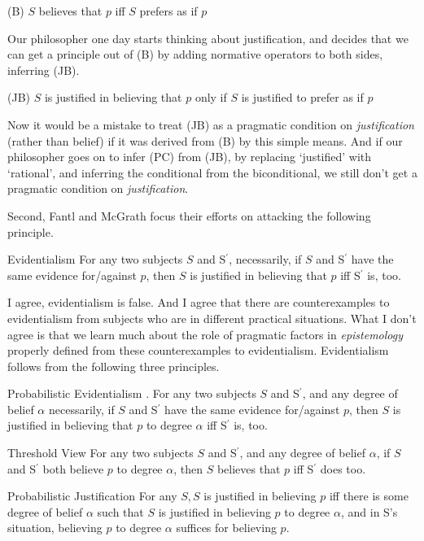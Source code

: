 \begin{description*}
\item[(B)] \(S\) believes that \(p\) iff \(S\) prefers as if \(p\)
\end{description*}

\noindent Our philosopher one day starts thinking about justification, and decides that we can get a principle out of (B) by adding normative operators to both sides, inferring (JB).

\begin{description*}
\item[(JB)] \(S\) is justified in believing that \(p\) only if \(S\) is justified to prefer as if \(p\)
\end{description*}

\noindent Now it would be a mistake to treat (JB) as a pragmatic condition on \textit{justification} (rather than belief) if it was derived from (B) by this simple means. And if our philosopher goes on to infer (PC) from (JB), by replacing `justified' with `rational', and inferring the conditional from the biconditional, we still don't get a pragmatic condition on \textit{justification}.

Second, Fantl and McGrath focus their efforts on attacking the following principle.

\begin{description*}
\item[Evidentialism] For any two subjects \(S\) and S\(^\prime\), necessarily, if \(S\) and S\(^\prime\) have the same evidence for/against \(p\), then \(S\) is justified in believing that \(p\) iff S\(^\prime\) is, too.
\end{description*}

\noindent I agree, evidentialism is false. And I agree that there are counterexamples to evidentialism from subjects who are in different practical situations. What I don't agree is that we learn much about the role of pragmatic factors in \textit{epistemology} properly defined from these counterexamples to evidentialism. Evidentialism follows from the following three principles.

\begin{description*}
\item[Probabilistic Evidentialism]. For any two subjects \(S\) and S\(^\prime\), and any degree of belief \(\alpha\) necessarily, if \(S\) and S\(^\prime\) have the same evidence for/against \(p\), then \(S\) is justified in believing that \(p\) to degree \(\alpha\) iff S\(^\prime\) is, too.
\item[Threshold View] For any two subjects \(S\) and S\(^\prime\), and any degree of belief \(\alpha\), if \(S\) and S\(^\prime\) both believe \(p\) to degree \(\alpha\), then \(S\) believes that \(p\) iff S\(^\prime\) does too.
\item[Probabilistic Justification] For any \(S, S\) is justified in believing \(p\) iff there is some degree of belief \(\alpha\) such that \(S\) is justified in believing \(p\) to degree \(\alpha\), and in S's situation, believing \(p\) to degree \(\alpha\) suffices for believing \(p\).
\end{description*}


